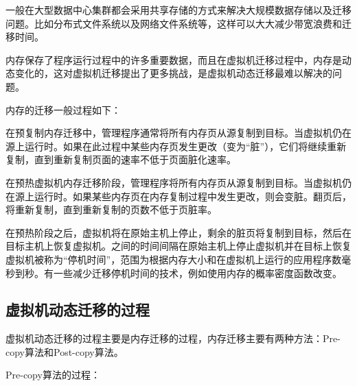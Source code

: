 一般在大型数据中心集群都会采用共享存储的方式来解决大规模数据存储以及迁移问题。比如分布式文件系统以及网络文件系统等，这样可以大大减少带宽浪费和迁移时间。

内存保存了程序运行过程中的许多重要数据，而且在虚拟机迁移过程中，内存是动态变化的，这对虚拟机迁移提出了更多挑战，是虚拟机动态迁移最难以解决的问题。

内存的迁移一般过程如下：

在预复制内存迁移中，管理程序通常将所有内存页从源复制到目标。当虚拟机仍在源上运行时。如果在此过程中某些内存页发生更改（变为“脏”），它们将继续重新复制，直到重新复制页面的速率不低于页面脏化速率。

在预热虚拟机内存迁移阶段，管理程序将所有内存页从源复制到目标。当虚拟机仍在源上运行时。如果某些内存页在内存复制过程中发生更改，则会变脏。翻页后，将重新复制，直到重新复制的页数不低于页脏率。

在预热阶段之后，虚拟机将在原始主机上停止，剩余的脏页将复制到目标，然后在目标主机上恢复虚拟机。之间的时间间隔在原始主机上停止虚拟机并在目标上恢复虚拟机被称为“停机时间”，范围为根据内存大小和在虚拟机上运行的应用程序数毫秒到秒。有一些减少迁移停机时间的技术，例如使用内存的概率密度函数改变。

\subsection{虚拟机动态迁移的过程}
虚拟机动态迁移的过程主要是内存迁移的过程，内存迁移主要有两种方法：Pre-copy算法和Post-copy算法\cite{Aidan}。

Pre-copy算法的过程：

